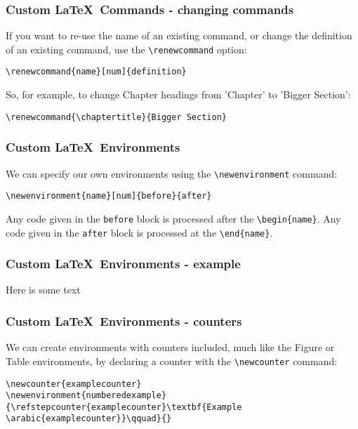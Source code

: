 \documentclass[mathserif]{beamer}
\newcommand{\tbs}[1]{\texttt{{\textbackslash}#1}}
\begin{document}
\begin{frame}[fragile]
\frametitle{Custom \LaTeX\ Commands - changing commands}
\vfill
If you want to re-use the name of an existing command, or change the definition of an existing command, use the \texttt{{\textbackslash}renewcommand} option:
\vfill
\begin{lstlisting}[style=latexsty]
\renewcommand{name}[num]{definition}
\end{lstlisting}
\vfill
So, for example, to change Chapter headings from 'Chapter' to 'Bigger Section':
\begin{lstlisting}[style=latexsty]
\renewcommand{\chaptertitle}{Bigger Section}
\end{lstlisting}
\vfill
\end{frame}

\begin{frame}[fragile]
\frametitle{Custom \LaTeX\ Environments}
\vfill
We can specify our own environments using the \texttt{{\textbackslash}newenvironment} command:
\vfill
\begin{lstlisting}[style=latexsty]
\newenvironment{name}[num]{before}{after}
\end{lstlisting}
\vfill
Any code given in the \texttt{before} block is processed after the \tbs{begin\{name\}}. Any code given in the \texttt{after} block is processed at the \tbs{end\{name\}}.
\vfill
\end{frame}

\begin{frame}[fragile]
\frametitle{Custom \LaTeX\ Environments - example}
\vfill
\begin{LTXexample}[style=latexsty]
\newenvironment{dotty}{\noindent\textbullet}{\dotfill}

\begin{dotty}
Here is some text
\end{dotty}

\end{LTXexample}
\vfill
\end{frame}

\begin{frame}[fragile]
\frametitle{Custom \LaTeX\ Environments - counters}
\vfill
We can create environments with counters included, much like the Figure or Table environments, by declaring a counter with the \tbs{newcounter} command:
\vfill
\begin{lstlisting}[style=latexsty]
\newcounter{examplecounter}
\newenvironment{numberedexample}{\refstepcounter{examplecounter}\textbf{Example \arabic{examplecounter}}\qquad}{}
\end{lstlisting}
\vfill
\end{frame}
\end{document}
